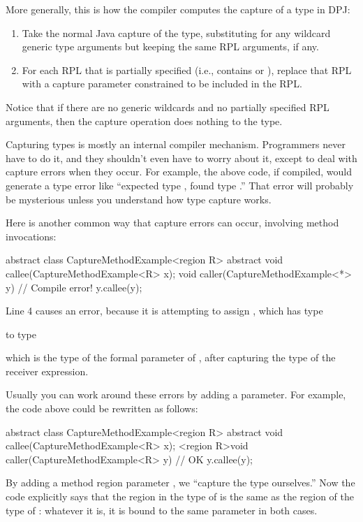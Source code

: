 More generally, this is how the compiler computes the capture of a type
in DPJ:
%
\begin{enumerate}
\item Take the normal Java capture of the type, substituting for any
  wildcard generic type arguments but keeping the same RPL
  arguments, if any.
\item For each RPL that is partially specified (i.e., contains \kwd{*}
  or \kwd{[?]}), replace that RPL with a capture parameter constrained
  to be included in the RPL.
\end{enumerate}
%
Notice that if there are no generic wildcards and no partially
specified RPL arguments, then the capture operation does nothing to
the type.

Capturing types is mostly an internal compiler mechanism.  Programmers
never have to do it, and they shouldn't even have to worry about it,
except to deal with capture errors when they occur.  For example, the
above code, if compiled, would generate a type error like ``expected
type , found type
.''  That error will probably be mysterious
unless you understand how type capture works.

Here is another common way that capture errors can occur, involving
method invocations:
%
\begin{numbereddpjlisting}
abstract class CaptureMethodExample<region R> {
  abstract void callee(CaptureMethodExample<R> x);
  void caller(CaptureMethodExample<*> y) {
    // Compile error!
    y.callee(y);
  }
}
\end{numbereddpjlisting}
%
Line 4 causes an error, because it is attempting to assign ,
which has type 
%
\begin{description}
\item {} 
\end{description}
%
to type 
%
\begin{description}
\item {}
\end{description}
%
which is the type of the formal parameter  of ,
after capturing the type of the receiver expression.

Usually you can work around these errors by adding a parameter.  For
example, the code above could be rewritten as follows:
%
\begin{numbereddpjlisting}
abstract class CaptureMethodExample<region R> {
  abstract void callee(CaptureMethodExample<R> x);
  <region R>void caller(CaptureMethodExample<R> y) {
    // OK
    y.callee(y);
  }
}
\end{numbereddpjlisting}
%
By adding a method region parameter , we ``capture the type
ourselves.''  Now the code explicitly says that the region in the type
of  is the same as the region of the type of : whatever
it is, it is bound to the same parameter  in both cases.



